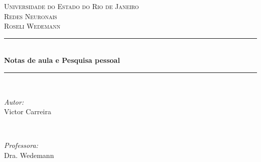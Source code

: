 \begin{titlepage}

\newcommand{\HRule}{\rule{\linewidth}{0.5mm}} %

\center %
 

\textsc{\Large Universidade do Estado do Rio de Janeiro}\\[1.0cm] %
\textsc{\large Redes Neuronais}\\[0.5cm] %
\textsc{\normalsize Roseli Wedemann}\\[0.5cm] %


\HRule \\[0.4cm]
{ \huge \bfseries \LARGE Notas de aula e Pesquisa pessoal}\\[0.4cm] %
\HRule \\[1.5cm]
 

\begin{minipage}{0.4\textwidth}
\begin{flushleft} \large
\emph{Autor:}\\
Victor Carreira %
\end{flushleft}
\end{minipage}
~
\begin{minipage}{0.4\textwidth}
\begin{flushright} \large
\emph{Professora:} \\
Dra. Wedemann %
\end{flushright}
\end{minipage}\\[2cm]



\end{titlepage}
